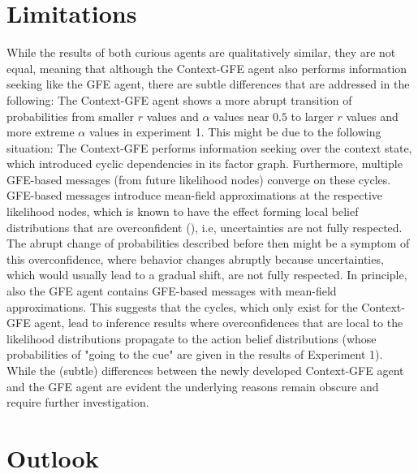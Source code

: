 \section{Limitations}

While the results of both curious agents are qualitatively similar, they are not equal, meaning that although the Context-GFE agent also performs information seeking like the GFE agent, there are subtle differences that are addressed in the following: The Context-GFE agent shows a more abrupt transition of probabilities from smaller \(r\) values and \(\alpha\) values near \(0.5\) to larger \(r\) values and more extreme \(\alpha\) values in experiment 1. This might be due to the following situation: The Context-GFE performs information seeking over the context state, which introduced cyclic dependencies in its factor graph. Furthermore, multiple GFE-based messages (from future likelihood nodes) converge on these cycles. GFE-based messages introduce mean-field approximations at the respective likelihood nodes, which is known to have the effect forming local belief distributions that are overconfident (\cite[Chapter~10]{bishop2006}), i.e, uncertainties are not fully respected. The abrupt change of probabilities described before then might be a symptom of this overconfidence, where behavior changes abruptly because uncertainties, which would usually lead to a gradual shift, are not fully respected. In principle, also the GFE agent contains GFE-based messages with mean-field approximations. This suggests that the cycles, which only exist for the Context-GFE agent, lead to inference results where overconfidences that are local to the likelihood distributions propagate to the action belief distributions (whose probabilities of "going to the cue" are given in the results of Experiment 1).
While the (subtle) differences between the newly developed Context-GFE agent and the GFE agent are evident the underlying reasons remain obscure and require further investigation.


\section{Outlook}

